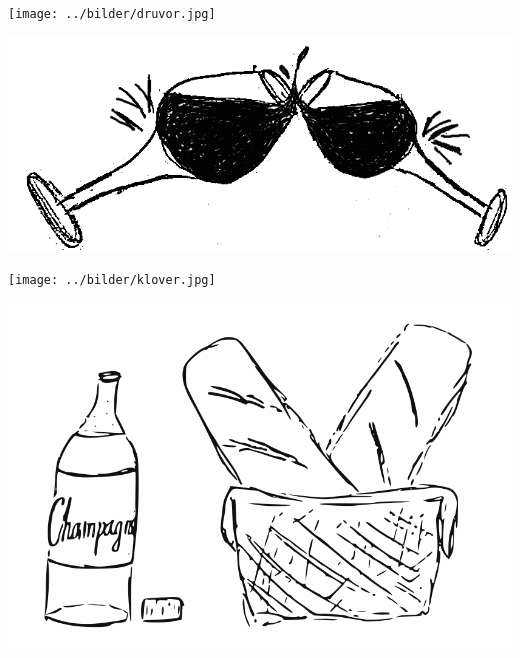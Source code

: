 
\begin{intersong}
\begin{center}
\texttt{[image: ../bilder/druvor.jpg]} 
\end{center}
\end{intersong}
\sclearpage

\begin{intersong}
	\begin{center}
		\includegraphics[width=1\textwidth]{../bilder/fardigabilder/CamillasFardigaBilder/Vinglassomskalar2.png} 
	\end{center}
\end{intersong}
\sclearpage

\begin{intersong}
	\begin{center}
		\texttt{[image: ../bilder/klover.jpg]} 
	\end{center}
\end{intersong}

\begin{intersong}
	\begin{center}
		\includegraphics[scale=0.5]{../bilder/batongochvin.png} 
	\end{center}
\end{intersong}